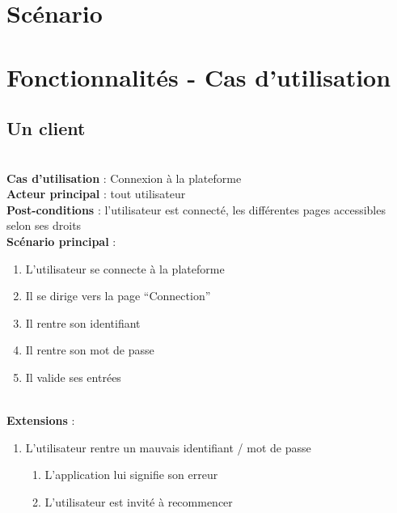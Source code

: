 \section{Scénario}


\section{Fonctionnalités - Cas d'utilisation}


\subsection{Un client}
~\\
\textbf{Cas d’utilisation} : Connexion à la plateforme\\
\textbf{Acteur principal} :   tout utilisateur\\
\textbf{Post-conditions} :   l’utilisateur est connecté, les différentes pages accessibles selon ses droits\\
\textbf{Scénario principal} :
\begin{enumerate}
 \item L’utilisateur se connecte à la plateforme
 \item Il se dirige vers la page “Connection”
 \item Il rentre son identifiant
 \item Il rentre son mot de passe
 \item Il valide ses entrées
\end{enumerate}
~\\
\textbf{Extensions} :
\begin{enumerate}
 \item L’utilisateur rentre un mauvais identifiant / mot de passe
    \begin{enumerate}
     \item L’application lui signifie son erreur
     \item L’utilisateur est invité à recommencer
    \end{enumerate}
\end{enumerate}


